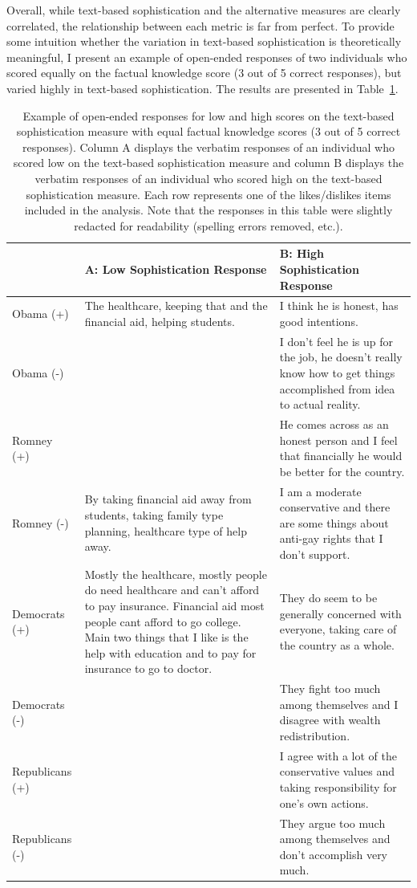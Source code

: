 \documentclass[12pt]{article}
\begin{document}
Overall, while text-based sophistication and the alternative measures are clearly correlated, the relationship between each metric is far from perfect. To provide some intuition whether the variation in text-based sophistication is theoretically meaningful, I present an example of open-ended responses of two individuals who scored equally on the factual knowledge score (3 out of 5 correct responses), but varied highly in text-based sophistication. The results are presented in Table~\ref{tab:ex1}.

\begin{table}[ht]\footnotesize\centering
\begin{tabular}{l|p{6.5cm}|p{6.5cm}}
   \toprule
  & A: Low Sophistication Response & B: High Sophistication Response \\ 
   \midrule
   Obama (+) & The healthcare, keeping that and the financial aid, helping students. & I think he is honest, has good intentions. \\ \hdashline
     Obama (-) &  & I don't feel he is up for the job, he doesn't really know how to get things accomplished from idea to actual reality. \\ \hdashline
     Romney (+) &  & He comes across as an honest person and I feel that financially he would be better for the country. \\ \hdashline
     Romney (-) & By taking financial aid away from students, taking family type planning, healthcare type of help away. & I am a moderate conservative and there are some things about anti-gay rights that I don't support. \\ \hdashline
     Democrats (+) & Mostly the healthcare, mostly people do need healthcare and can't afford to pay insurance. Financial aid most people cant afford to go college. Main two things that I like is the help with education and to pay for insurance to go to doctor. & They do seem to be generally concerned with everyone, taking care of the country as a whole. \\ \hdashline
     Democrats (-) &  & They fight too much among themselves and I disagree with wealth redistribution. \\ \hdashline
     Republicans (+) &  & I agree with a lot of the conservative values and taking responsibility for one's own actions. \\ \hdashline
     Republicans (-) &  & They argue too much among themselves and don't accomplish very much. \\ 
    \bottomrule
 \end{tabular}
\caption{Example of open-ended responses for low and high scores on the text-based sophistication measure with equal factual knowledge scores (3 out of 5 correct responses). Column A displays the verbatim responses of an individual who scored low on the text-based sophistication measure and column B displays the verbatim responses of an individual who scored high on the text-based sophistication measure. Each row represents one of the likes/dislikes items included in the analysis. Note that the responses in this table were slightly redacted for readability (spelling errors removed, etc.).}\label{tab:ex1}
\end{table}
\end{document}

